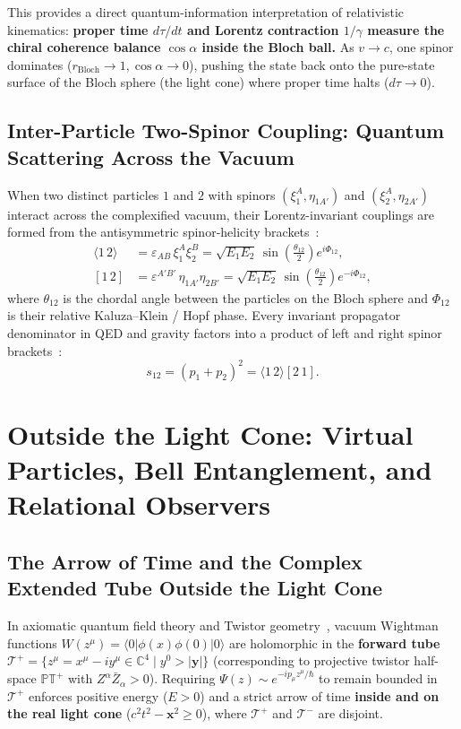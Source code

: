 \documentclass[11pt,a4paper]{article}
\begin{document}
This provides a direct quantum-information interpretation of relativistic kinematics: \textbf{proper time $d\tau/dt$ and Lorentz contraction $1/\gamma$ measure the chiral coherence balance $\cos\alpha$ inside the Bloch ball.} As $v \to c$, one spinor dominates ($r_{\text{Bloch}} \to 1, \cos\alpha \to 0$), pushing the state back onto the pure-state surface of the Bloch sphere (the light cone) where proper time halts ($d\tau \to 0$).

\subsection{Inter-Particle Two-Spinor Coupling: Quantum Scattering Across the Vacuum}
When two distinct particles $1$ and $2$ with spinors $(\xi_1^A, \eta_{1A'})$ and $(\xi_2^A, \eta_{2A'})$ interact across the complexified vacuum, their Lorentz-invariant couplings are formed from the antisymmetric spinor-helicity brackets~\cite{PenroseRindler1984,ParkeTaylor1986}:
\begin{equation}
\begin{aligned}
\langle 1 \, 2 \rangle &= \varepsilon_{AB}\, \xi_1^A \xi_2^B = \sqrt{E_1 E_2}\, \sin\left(\frac{\theta_{12}}{2}\right) e^{i\Phi_{12}}, \\
[ 1 \, 2 ] &= \varepsilon^{A'B'}\, \eta_{1A'} \eta_{2B'} = \sqrt{E_1 E_2}\, \sin\left(\frac{\theta_{12}}{2}\right) e^{-i\Phi_{12}},
\end{aligned}
\end{equation}
where $\theta_{12}$ is the chordal angle between the particles on the Bloch sphere and $\Phi_{12}$ is their relative Kaluza--Klein / Hopf phase. Every invariant propagator denominator in QED and gravity factors into a product of left and right spinor brackets~\cite{ParkeTaylor1986}:
\begin{equation}
s_{12} = (p_1 + p_2)^2 = \langle 1 \, 2 \rangle [ 2 \, 1 ].
\end{equation}

\section{Outside the Light Cone: Virtual Particles, Bell Entanglement, and Relational Observers}

\subsection{The Arrow of Time and the Complex Extended Tube Outside the Light Cone}
In axiomatic quantum field theory and Twistor geometry~\cite{Penrose1967,StreaterWightman1964}, vacuum Wightman functions $W(z^\mu) = \langle 0 | \phi(x)\phi(0) | 0 \rangle$ are holomorphic in the \textbf{forward tube} $\mathcal{T}^+ = \{ z^\mu = x^\mu - i y^\mu \in \mathbb{C}^4 \mid y^0 > |\mathbf{y}| \}$ (corresponding to projective twistor half-space $\mathbb{PT}^+$ with $Z^\alpha \bar{Z}_\alpha > 0$). Requiring $\Psi(z) \sim e^{-i p_\mu z^\mu/\hbar}$ to remain bounded in $\mathcal{T}^+$ enforces positive energy ($E > 0$) and a strict arrow of time \textbf{inside and on the real light cone} ($c^2 t^2 - \mathbf{x}^2 \ge 0$), where $\mathcal{T}^+$ and $\mathcal{T}^-$ are disjoint.
\end{document}

